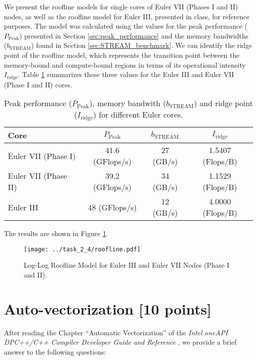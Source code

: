 \documentclass[unicode,11pt,a4paper,oneside,numbers=endperiod,openany]{scrartcl}
\begin{document}
We present the roofline models for single cores of Euler VII (Phases I 
and II) nodes, as well as the roofline model for Euler III, presented in class, for reference 
purposes. 
The model was calculated using the values for the peak performance ($P_{\text{Peak}}$) 
presented in Section \ref{sec:peak_performance} and the memory bandwidths ($b_{\text{STREAM}}$) found in
Section \ref{sec:STREAM_benchmark}.
We can identify the ridge point of the roofline model, which represents the transition point between
the memory-bound and compute-bound regions in terms of its operational intensity $I_{\text{ridge}}$. 
Table \ref{tab:ridge_point} summarizes these three values for the Euler III and Euler VII (Phase I and II) cores.
\begin{table}[htbp]
    \centering
    \caption{Peak performance ($P_{\text{Peak}}$), memory bandwith ($b_{\text{STREAM}}$) and ridge point ($I_{\text{ridge}}$)
    for different Euler cores.}
    \begin{tabular}{||lccc||}
        \hline
        Core & $P_{\text{Peak}}$ & $b_{\text{STREAM}}$ & $I_{\text{ridge}}$ \\
        \hline
        \hline
        Euler VII (Phase I) & 41.6  (GFlops/s) & 27 (GB/s) & 1.5407 (Flops/B) \\
        Euler VII (Phase II) & 39.2 (GFlops/s)  & 34 (GB/s) & 1.1529 (Flops/B) \\
        Euler III & 48 (GFlops/s)  & 12 (GB/s) & 4.0000 (Flops/B) \\
        \hline
    \end{tabular}\label{tab:ridge_point}
\end{table}
The results are shown in Figure \ref{fig:roofline}.
\begin{figure}[htbp]
    \centering
    \texttt{[image: ../task\_2\_4/roofline.pdf]}
    \caption{Log-Log Roofline Model for Euler III and Euler VII Nodes (Phase I and II).}
    \label{fig:roofline}
\end{figure}

\section{Auto-vectorization [10 points]}

After reading the Chapter “Automatic Vectorization” of the \textit{Intel oneAPI DPC++/C++ Compiler Developer
Guide and Reference} \cite{intel-oneapi}, we provide a brief answer to the following questions:
\end{document}
